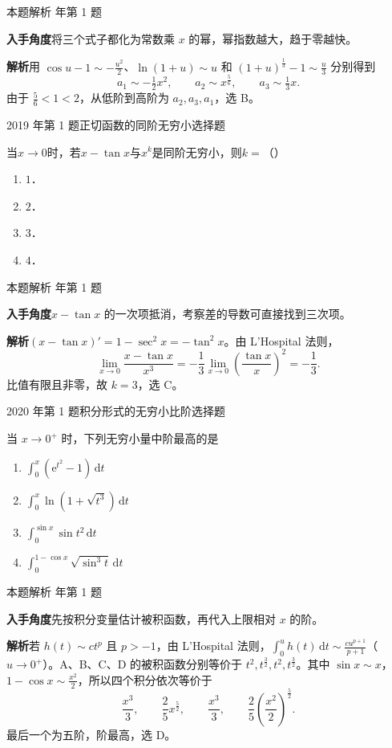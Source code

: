 \documentclass[UTF8,zihao=-4,fontset=fandol]{ctexart}
\renewcommand{\lim}{\operatorname*{lim}\limits}
\newcommand{\pickout}{\hfill（\hspace{1.4em}）}
\newenvironment{abcd}{\begin{enumerate}[label=\textup{(\Alph*)},leftmargin=2.3em,itemsep=1pt,topsep=4pt,parsep=1pt]}{\end{enumerate}}
\newcommand{\choices}[4]{%
  \begin{abcd}
    \item #1
    \item #2
    \item #3
    \item #4
  \end{abcd}}
\newcommand{\QuestionPage}[6]{%
  \par\noindent\begin{minipage}{\linewidth}
  \raggedright
  {\small\textcolor{black!60}{#3\quad #5}\hfill\textcolor{accent}{#2}}\par\smallskip}
\newcommand{\QuestionEnd}{\end{minipage}\par\medskip}
\newcommand{\QuestionPage}[6]{%
  \clearpage
  {\small\textcolor{accent}{#1\hfill #2}}\par\medskip
  {\small\textcolor{black!60}{#3\quad #5\hfill #6}}\par\vspace{9bp}}
\newcommand{\QuestionEnd}{}
\newenvironment{QuestionSolution}[1]{%
  \clearpage
  {\small\textcolor{black!60}{本题解析\quad #1}}\par\medskip
}{\par\clearpage}
\begin{document}
\begin{QuestionSolution}{2016 年第 1 题}
\textbf{入手角度}\quad 将三个式子都化为常数乘 \(x\) 的幂，幂指数越大，趋于零越快。

\textbf{解析}\quad 用 \(\cos u-1\sim-\frac{u^2}{2}\)、\(\ln(1+u)\sim u\) 和 \((1+u)^{\frac{1}{3}}-1\sim \frac{u}{3}\) 分别得到
\[
a_1\sim-\tfrac12x^2,\qquad a_2\sim x^{\frac{5}{6}},\qquad a_3\sim\tfrac13x.
\]
由于 \(\frac{5}{6}<1<2\)，从低阶到高阶为 \(a_2,a_3,a_1\)，选 B。
\end{QuestionSolution}

\QuestionPage{1.4 无穷小量与无穷大量}{选择题}{2019 年第 1 题}{1}{正切函数的同阶无穷小}{024 / 234}
当$x \to 0$时，若$x - \tan x$与$x^k$是同阶无穷小，则$k =$\pickout{}
\begin{abcd}
\item $1$．
\item $2$．
\item $3$．
\item $4$．
\end{abcd}
\QuestionEnd

\begin{QuestionSolution}{2019 年第 1 题}
\textbf{入手角度}\quad \(x-\tan x\) 的一次项抵消，考察差的导数可直接找到三次项。

\textbf{解析}\quad \((x-\tan x)'=1-\sec^2x=-\tan^2 x\)。由 L'Hospital 法则，
\[
\lim_{x\to0}\frac{x-\tan x}{x^3}
=-\frac13\lim_{x\to0}\left(\frac{\tan x}{x}\right)^2=-\frac13.
\]
比值有限且非零，故 \(k=\boxed{3}\)，选 C。
\end{QuestionSolution}

\QuestionPage{1.4 无穷小量与无穷大量}{选择题}{2020 年第 1 题}{1}{积分形式的无穷小比阶}{025 / 234}
当 \(x \to 0^{+}\) 时，下列无穷小量中阶最高的是
\choices{\(\int_{0}^{x}{\left( \mathrm{e}^{t^{2}} - 1 \right) \,\mathrm{d} t}\)}{\(\int_{0}^{x}{\ln \left( 1 + \sqrt{t^{3}} \right) \,\mathrm{d} t}\)}{\(\int_{0}^{\sin x}{\sin t^{2} \,\mathrm{d} t}\)}{\(\int_{0}^{1-\cos x}{\sqrt{\sin^{3} t} \,\mathrm{d} t}\)}
\QuestionEnd

\begin{QuestionSolution}{2020 年第 1 题}
\textbf{入手角度}\quad 先按积分变量估计被积函数，再代入上限相对 \(x\) 的阶。

\textbf{解析}\quad 若 \(h(t)\sim c t^p\) 且 \(p>-1\)，由 L'Hospital 法则，\(\int_0^u h(t)\,\mathrm{d}t\sim \frac{c u^{p+1}}{p+1}\)（\(u\to0^+\)）。A、B、C、D 的被积函数分别等价于 \(t^2,t^{\frac{3}{2}},t^2,t^{\frac{3}{2}}\)。其中 \(\sin x\sim x\)，\(1-\cos x\sim \frac{x^2}{2}\)，所以四个积分依次等价于
\[
\frac{x^3}3,\qquad \frac25 x^{\frac{5}{2}},\qquad
\frac{x^3}3,\qquad \frac25\left(\frac{x^2}2\right)^{\frac{5}{2}}.
\]
最后一个为五阶，阶最高，选 D。
\end{QuestionSolution}
\end{document}
